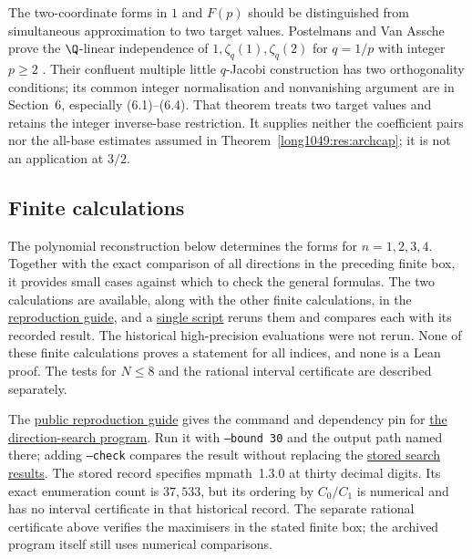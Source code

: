 The two-coordinate forms in $1$ and $F(p)$ should be distinguished
from simultaneous approximation to two target values. Postelmans and Van Assche prove the $\Q$-linear independence
of $1,\zeta_q(1),\zeta_q(2)$ for $q=1/p$ with integer $p\ge2$
\cite[Thm.~1.3, p.~3]{postelmansvanassche2007}.
Their confluent multiple little $q$-Jacobi construction has two
orthogonality conditions; its common integer normalisation and
nonvanishing argument are in Section~6, especially (6.1)--(6.4).
That theorem treats two target values and retains the integer
inverse-base restriction. It supplies neither the coefficient pairs
nor the all-base estimates assumed in Theorem~\ref{long1049:res:archcap};
it is not an application at $3/2$.

\subsection{Finite calculations}\label{long1049:sec:receipts}

The polynomial reconstruction below determines the forms for
$n=1,2,3,4$. Together with the exact comparison of all directions in
the preceding finite box, it provides small cases against which to
check the general formulas. The two calculations are available,
along with the other finite calculations, in the
\href{https://github.com/wcook04/plectis-erdos/blob/f5c9e560df38cd32e9b49473a409384aab00d9ae/research/experiments/erdos1049/README.md}{reproduction guide}, and a
\href{https://github.com/wcook04/plectis-erdos/blob/f5c9e560df38cd32e9b49473a409384aab00d9ae/research/experiments/erdos1049/replay.py}{single script}
reruns them and compares each with its recorded result. The historical
high-precision evaluations were not rerun. None of these finite
calculations proves a statement for all indices, and none is a Lean proof. The
tests for $N\le8$ and the rational interval certificate are described
separately.

The \href{https://github.com/wcook04/plectis-erdos/blob/f5c9e560df38cd32e9b49473a409384aab00d9ae/research/experiments/erdos1049/README.md}{public reproduction guide} gives the command and dependency pin for
\href{https://github.com/wcook04/plectis-erdos/blob/39a0a2078c8f9fbe7fc24f912654815cc24685df/research/experiments/erdos1049/direction_search.py}{the direction-search program}.
Run it with \texttt{--bound 30} and the output path named there; adding
\texttt{--check} compares the result without replacing the
\href{https://github.com/wcook04/plectis-erdos/blob/39a0a2078c8f9fbe7fc24f912654815cc24685df/research/experiments/erdos1049/receipts/direction-search-bound30.json}{stored search results}.
The stored record specifies mpmath~1.3.0 at thirty decimal digits.  Its exact enumeration
count is $37{,}533$, but its ordering by $C_0/C_1$ is numerical and has no
interval certificate in that historical record. The separate rational
certificate above verifies the maximisers in the stated finite box;
the archived program itself still uses numerical comparisons.

